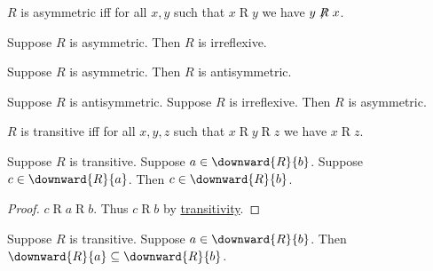 \begin{definition}\label{asymmetric}
    $R$ is asymmetric iff
    for all $x, y$ such that
    $x\mathrel{R} y$ we have $y\not\mathrel{R}x$.
\end{definition}

\begin{proposition}\label{asymmetric_implies_irreflexive}
    Suppose $R$ is asymmetric.
    Then $R$ is irreflexive.
\end{proposition}

\begin{proposition}\label{asymmetric_implies_antisymmetric}
    Suppose $R$ is asymmetric.
    Then $R$ is antisymmetric.
\end{proposition}

\begin{proposition}\label{antisymmetric_and_irreflexive_implies_asymmetric}
    Suppose $R$ is antisymmetric.
    Suppose $R$ is irreflexive.
    Then $R$ is asymmetric.
\end{proposition}


\begin{definition}[Transitivity]\label{transitive}
    $R$ is transitive iff
    for all $x, y, z$ such that $x\mathrel{R}y\mathrel{R}z$
        we have $x\mathrel{R} z$.
\end{definition}

\begin{proposition}\label{transitive_downward_elem}
    Suppose $R$ is transitive.
    Suppose $a\in\downward{R}{b}$.
    Suppose $c\in\downward{R}{a}$.
    Then $c\in \downward{R}{b}$.
\end{proposition}
\begin{proof}
    $c\mathrel{R} a\mathrel{R}b$.
    Thus $c\mathrel{R} b$ by \hyperref[transitive]{transitivity}.
\end{proof}

\begin{proposition}\label{transitive_downward_subseteq}
    Suppose $R$ is transitive.
    Suppose $a\in\downward{R}{b}$.
    Then $\downward{R}{a}\subseteq \downward{R}{b}$.
\end{proposition}

